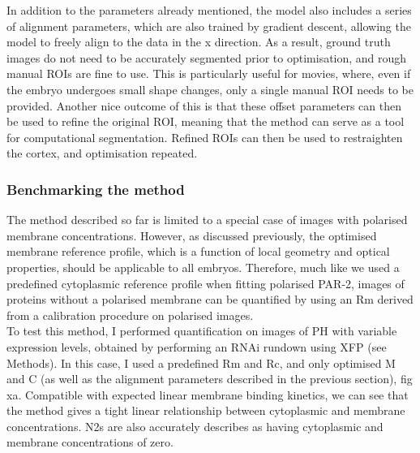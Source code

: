 \documentclass[12pt]{"article"}
\begin{document}
In addition to the parameters already mentioned, the model also includes a series of alignment parameters, which are also trained by gradient descent, allowing the model to freely align to the data in the x direction. As a result, ground truth images do not need to be accurately segmented prior to optimisation, and rough manual ROIs are fine to use. This is particularly useful for movies, where, even if the embryo undergoes small shape changes, only a single manual ROI needs to be provided. Another nice outcome of this is that these offset parameters can then be used to refine the original ROI, meaning that the method can serve as a tool for computational segmentation. Refined ROIs can then be used to restraighten the cortex, and optimisation repeated.\\


\clearpage
\subsubsection{Benchmarking the method}

The method described so far is limited to a special case of images with polarised membrane concentrations. However, as discussed previously, the optimised membrane reference profile, which is a function of local geometry and optical properties, should be applicable to all embryos. Therefore, much like we used a predefined cytoplasmic reference profile when fitting polarised PAR-2, images of proteins without a polarised membrane can be quantified by using an Rm derived from a calibration procedure on polarised images. \\

To test this method, I performed quantification on images of PH with variable expression levels, obtained by performing an RNAi rundown using XFP (see Methods). In this case, I used a predefined Rm and Rc, and only optimised M and C (as well as the alignment parameters described in the previous section), fig xa. Compatible with expected linear membrane binding kinetics, we can see that the method gives a tight linear relationship between cytoplasmic and membrane concentrations. N2s are also accurately describes as having cytoplasmic and membrane concentrations of zero.\\
\end{document}
